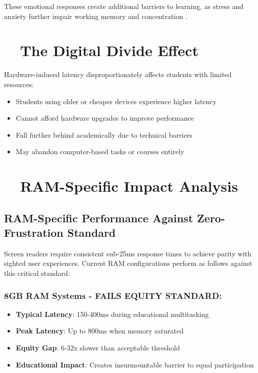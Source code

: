 These emotional responses create additional barriers to learning, as stress and anxiety further impair working memory and concentration \supercite{Eysenck2007AnxietyAndCognition}.

\section{~~The Digital Divide Effect}\label{the-digital-divide-effect}

Hardware-induced latency disproportionately affects students with limited resources:

\begin{itemize}
	\item Students using older or cheaper devices experience higher latency \supercite{Attewell2001TheDigitalDivide}
	\item Cannot afford hardware upgrades to improve performance \supercite{Warschauer2003TechnologyAndSocialInclusion}
	\item Fall further behind academically due to technical barriers \supercite{DiMaggio2001FromUnequalAccess}
	\item May abandon computer-based tasks or courses entirely \supercite{Compaine2001TheDigitalDivide}
\end{itemize}

\section{~~RAM-Specific Impact Analysis}\label{ram-specific-impact-analysis}

\subsection{RAM-Specific Performance Against Zero-Frustration Standard}\label{ram-specific-performance-against-zero-frustration-standard}

Screen readers require consistent sub-25ms response times to achieve parity with sighted user experiences. Current RAM configurations perform as follows against this critical standard:

\subsubsection{8GB RAM Systems - FAILS EQUITY STANDARD:}

\begin{itemize}
	\item \textbf{Typical Latency}: 150-400ms during educational multitasking
	\item \textbf{Peak Latency}: Up to 800ms when memory saturated
	\item \textbf{Equity Gap}: 6-32x slower than acceptable threshold \supercite{EquityAnalysisRevision}
	\item \textbf{Educational Impact}: Creates insurmountable barrier to equal participation \supercite{EducationalEquityReport2024}
\end{itemize}


